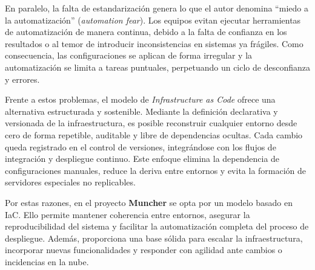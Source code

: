 En paralelo, la falta de estandarización genera lo que el autor denomina “miedo a la automatización” (\textit{automation fear}). Los equipos evitan ejecutar herramientas de automatización de manera continua, debido a la falta de confianza en los resultados o al temor de introducir inconsistencias en sistemas ya frágiles. Como consecuencia, las configuraciones se aplican de forma irregular y la automatización se limita a tareas puntuales, perpetuando un ciclo de desconfianza y errores.

Frente a estos problemas, el modelo de \textit{Infrastructure as Code} ofrece una alternativa estructurada y sostenible. Mediante la definición declarativa y versionada de la infraestructura, es posible reconstruir cualquier entorno desde cero de forma repetible, auditable y libre de dependencias ocultas. Cada cambio queda registrado en el control de versiones, integrándose con los flujos de integración y despliegue continuo. Este enfoque elimina la dependencia de configuraciones manuales, reduce la deriva entre entornos y evita la formación de servidores especiales no replicables.

Por estas razones, en el proyecto \textbf{Muncher} se opta por un modelo basado en IaC. Ello permite mantener coherencia entre entornos, asegurar la reproducibilidad del sistema y facilitar la automatización completa del proceso de despliegue. Además, proporciona una base sólida para escalar la infraestructura, incorporar nuevas funcionalidades y responder con agilidad ante cambios o incidencias en la nube.
